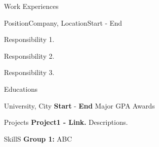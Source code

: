 \documentclass{resume} %
\begin{document}
\begin{rSection}{Work Experiences}
  \begin{rWork}{Position}{Company, Location}{Start - End}
    \item Responsibility 1.
    \item Responsibility 2.
    \item Responsibility 3.
  \end{rWork}
\end{rSection}
\begin{rSection}{Educations}
\begin{rSchool}{University, City}
  {\textbf{Start} - \textbf{End}}
  {Major}
  {GPA}
  {Awards}
\end{rSchool}
\end{rSection}
\begin{rSection}{Projects}
\textbf{Project1 - {Link}.} Descriptions.
\end{rSection}
\begin{rSection}{SkillS}
\textbf{Group 1:} ABC
\end{rSection}
\end{document}

